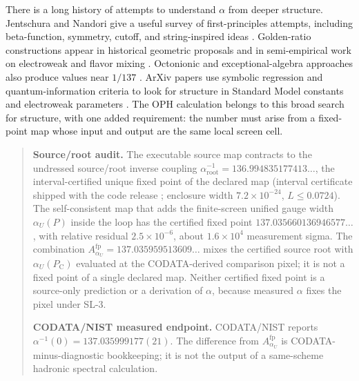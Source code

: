 \documentclass[11pt]{article}
\theoremstyle{remark}
\newcommand{\alphainv}{\alpha^{-1}}
\newcommand{\Ppub}{P_{\mathrm C}}
\begin{document}
There is a long history of attempts to understand \(\alpha\) from deeper structure. Jentschura and Nandori give a useful survey of first-principles attempts, including beta-function, symmetry, cutoff, and string-inspired ideas \cite{jentschura-nandori}. Golden-ratio constructions appear in historical geometric proposals \cite{heyrovska-narayan} and in semi-empirical work on electroweak and flavor mixing \cite{ciborowski}. Octonionic and exceptional-algebra approaches also produce values near \(1/137\) \cite{singh}. ArXiv papers use symbolic regression and quantum-information criteria to look for structure in Standard Model constants and electroweak parameters \cite{chekanov-kjellerstrand,liu-low-yin}. The OPH calculation belongs to this broad search for structure, with one added requirement: the number must arise from a fixed-point map whose input and output are the same local screen cell.

\begin{quote}\small
\textbf{Source/root audit.} The executable source map contracts to the undressed source/root inverse coupling \(\alphainv_{\mathrm{root}}=136.994835177413\ldots\), the interval-certified unique fixed point of the declared map (interval certificate shipped with the code release \cite{oph-code}; enclosure width \(7.2\times10^{-24}\), \(L\le0.0724\)). The self-consistent map that adds the finite-screen unified gauge width \(\alpha_U(P)\) inside the loop has the certified fixed point \(137.035660136946577\ldots\), with relative residual \(2.5\times10^{-6}\), about \(1.6\times10^{4}\) measurement sigma. The combination \(A_{\alpha_U}^{\mathrm{fp}}=137.035959513609\ldots\) mixes the certified source root with \(\alpha_U(\Ppub)\) evaluated at the CODATA-derived comparison pixel; it is not a fixed point of a single declared map. Neither certified fixed point is a source-only prediction or a derivation of \(\alpha\), because measured \(\alpha\) fixes the pixel under SL-3.

\textbf{CODATA/NIST measured endpoint.} CODATA/NIST reports \(\alphainv(0)=137.035999177(21)\). The difference from \(A_{\alpha_U}^{\mathrm{fp}}\) is CODATA-minus-diagnostic bookkeeping; it is not the output of a same-scheme hadronic spectral calculation.
\end{quote}
\end{document}
